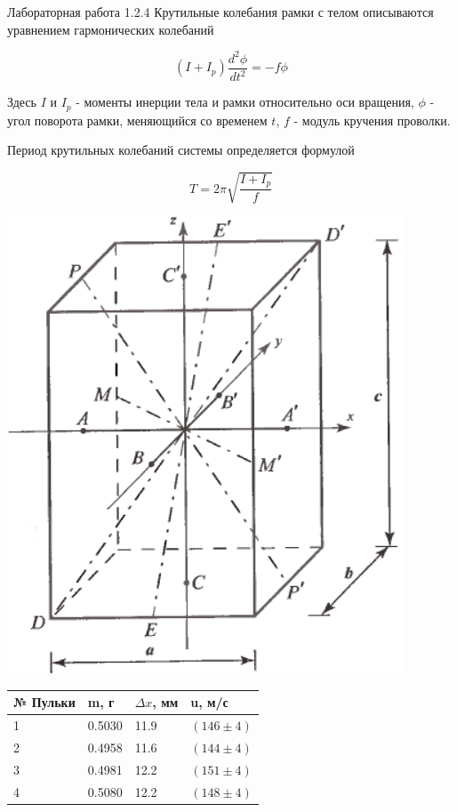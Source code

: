 \documentclass{astroedu-lab}
\begin{document}
\begin{problem}{\large Лабораторная работа 1.2.4}
Крутильные колебания рамки с телом описываются уравнением гармонических колебаний

\begin{equation}
	\left(I + I_p \right) \frac{d^2 \phi}{dt^2} = - f \phi
\end{equation}

Здесь $I$ и $I_p$  - моменты инерции тела и рамки относительно оси вращения, $\phi$ - угол поворота рамки, меняющийся со временем $t$, $f$ - модуль кручения проволки.

Период крутильных колебаний системы определяется формулой

\begin{equation}
	T = 2 \pi \sqrt{\frac{I + I_p}{f}}
\end{equation}

\begin{center}
\includegraphics[width=0.5\linewidth]{scheme.png}
\end{center}

\begin{center}
\begin{tabular}[t]{|l|l|l|l|}
\hline
№ Пульки & m, г & $\Delta x$, мм & u, м/с \\
\hline
1 & 0.5030 & 11.9 & $(146 \pm 4)$ \\
2 & 0.4958 & 11.6 & $(144 \pm 4)$ \\
3 & 0.4981 & 12.2 & $(151 \pm 4)$ \\
4 & 0.5080 & 12.2 & $(148 \pm 4)$ \\
\hline
\end{tabular}
\end{center}



\end{problem}
\end{document}
